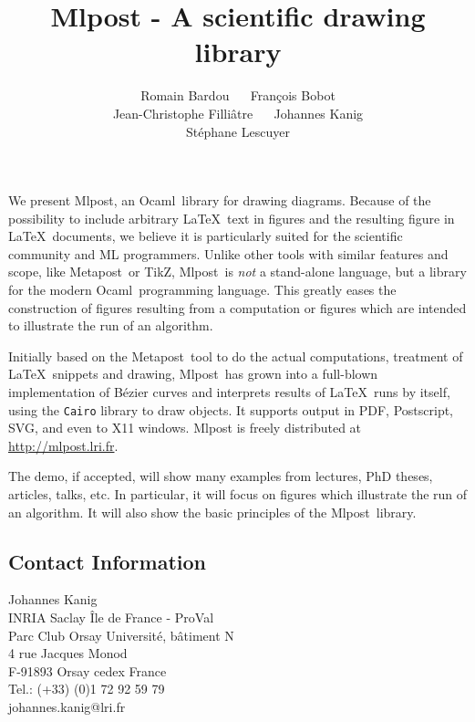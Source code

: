 \documentclass{article}
\title{Mlpost - A scientific drawing library}
\date{}
\author{Romain Bardou ~\hfill~ François Bobot \\ Jean-Christophe
  Filliâtre ~\hfill~ Johannes Kanig \\ Stéphane Lescuyer}
\newcommand{\mlpost}{Mlpost}
\newcommand{\ocaml}{Ocaml}
\newcommand{\metapost}{Metapost}
\newcommand{\tikz}{TikZ}
\begin{document}
\maketitle

We present \mlpost, an \ocaml\ library for drawing diagrams. Because
of the possibility to include arbitrary \LaTeX\ text in figures
and the resulting figure in \LaTeX\ documents, we believe
it is particularly suited for the scientific community and ML
programmers. Unlike other tools with similar features and scope,
like \metapost\ or \tikz, \mlpost\ is {\em not} a stand-alone
language, but a library for the modern \ocaml\ programming language.
This greatly eases the construction of figures resulting from a
computation or figures which are intended to illustrate the run of an
algorithm.

Initially based on the \metapost\ tool to do the actual
computations, treatment of \LaTeX\ snippets and drawing, \mlpost\ has
grown into a full-blown implementation of Bézier curves and interprets
results of \LaTeX\ runs by itself, using the {\tt Cairo} library
to draw objects. It supports output in PDF, Postscript, SVG,
and even to X11 windows. Mlpost is freely distributed at \url{http://mlpost.lri.fr}.

The demo, if accepted, will show many examples from lectures, PhD
theses, articles, talks, etc. In particular, it will focus on figures
which illustrate the run of an algorithm. It will also show the basic
principles of the \mlpost\ library.


\subsection*{Contact Information}

Johannes Kanig\\
INRIA Saclay Île de France - ProVal\\
Parc Club Orsay Université, bâtiment N\\
4 rue Jacques Monod\\
F-91893 Orsay cedex France\\
Tel.: (+33) (0)1 72 92 59 79\\
johannes.kanig@lri.fr
\end{document}
